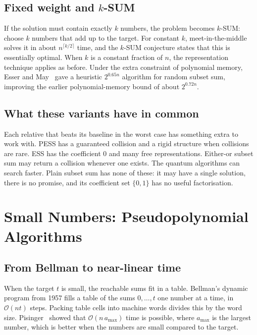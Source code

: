 \documentclass[11pt]{article}
\newcommand{\Oh}{\mathcal{O}}
\begin{document}
\subsection{Fixed weight and $k$-SUM}
If the solution must contain exactly $k$ numbers, the problem becomes $k$-SUM:
choose $k$ numbers that add up to the target. For constant $k$,
meet-in-the-middle solves it in about $n^{\lceil k/2\rceil}$ time, and the
$k$-SUM conjecture states that this is essentially optimal. When $k$ is a
constant fraction of $n$, the representation technique applies as before.
Under the extra constraint of polynomial memory, Esser and May~\cite{em} gave a
heuristic $2^{0.65n}$ algorithm for random subset sum, improving the earlier
polynomial-memory bound of about $2^{0.72n}$.

\subsection{What these variants have in common}
Each relative that beats its baseline in the worst case has something extra
to work with. PESS has a guaranteed collision and a rigid structure when
collisions are rare. ESS has the coefficient $0$ and many free representations.
Either-or subset sum may return a collision whenever one exists. The quantum
algorithms can search faster. Plain subset sum has none of these: it may have
a single solution, there is no promise, and its coefficient set $\{0,1\}$ has
no useful factorisation.

\section{Small Numbers: Pseudopolynomial Algorithms}\label{sec:pseudo}

\subsection{From Bellman to near-linear time}
When the target $t$ is small, the reachable sums fit in a table. Bellman's
dynamic program from 1957 fills a table of the sums $0,\dots,t$ one number at a
time, in $\Oh(nt)$ steps. Packing table cells into machine words divides this
by the word size. Pisinger~\cite{pis} showed that $\Oh(n\,a_{\max})$ time is
possible, where $a_{\max}$ is the largest number, which is better when the
numbers are small compared to the target.
\end{document}
